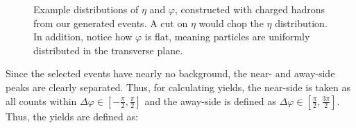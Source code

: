 \documentclass[../main.tex]{subfiles}
\begin{document}
\begin{figure}[h]%
    \centering
    \qquad
    \caption{Example distributions of $\eta$ and $\varphi$, constructed with charged hadrons from our generated events. A cut on $\eta$ would chop the $\eta$ distribution. In addition, notice how $\varphi$ is flat, meaning particles are uniformly distributed in the transverse plane.}%
    \label{fig:yield_ratios}%
\end{figure}

Since the selected events have nearly no background, the near- and away-side peaks are clearly separated. Thus, for calculating yields, the near-side is taken as all counts within $\Delta \varphi \in [-\frac{\pi}{2}, \frac{\pi}{2}]$ and the away-side is defined as $\Delta \varphi \in [\frac{\pi}{2}, \frac{3\pi}{2}]$. Thus, the yields are defined as:
\end{document}
